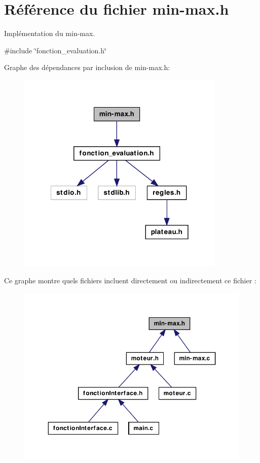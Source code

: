 \hypertarget{min-max_8h}{
\section{Référence du fichier min-\/max.h}
\label{min-max_8h}
}


Implémentation du min-\/max.  


{\ttfamily \#include \char`\"{}fonction\_\-evaluation.h\char`\"{}}\par
Graphe des dépendances par inclusion de min-\/max.h:\nopagebreak
\begin{figure}[H]
\begin{center}
\leavevmode
\includegraphics[width=282pt]{min-max_8h__incl}
\end{center}
\end{figure}
Ce graphe montre quels fichiers incluent directement ou indirectement ce fichier :
\nopagebreak
\begin{figure}[H]
\begin{center}
\leavevmode
\includegraphics[width=358pt]{min-max_8h__dep__incl}
\end{center}
\end{figure}
